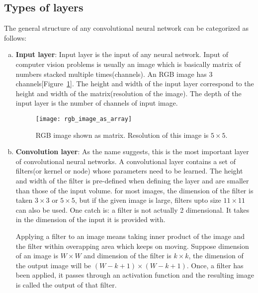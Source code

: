 \subsection{Types of layers}
\label{subsection:types_of_layers}
The general structure of any convolutional neural network can be categorized as follows:
\begin{enumerate}[(a)]
    \item \textbf{Input layer}:
        Input layer is the input of any neural network. Input of computer vision problems is usually an image which is basically matrix of numbers stacked multiple times(channels). An RGB image has 3 channels[Figure~\ref{fig:RGB_image}]. The height and width of the input layer correspond to the height and width of the matrix(resolution of the image). The depth of the input layer is the number of channels of input image.
        \begin{figure}[h!]
            \centering
            \texttt{[image: rgb\_image\_as\_array]}
            \caption[RGB image shown as matrix]{RGB image shown as matrix. Resolution of this image is $5\times5$.}
            \label{fig:RGB_image}
        \end{figure}
        
    \item \textbf{Convolution layer}:
        As the name suggests, this is the most important layer of convolutional neural networks. A convolutional layer contains a set of filters(or kernel or node) whose parameters need to be learned. The height and width of the filter is pre-defined when defining the layer and are smaller than those of the input volume. for most images, the dimension of the filter is taken $3\times3$ or $5\times5$, but if the given image is large, filters upto size $11\times11$ can also be used. One catch is: a filter is not actually 2 dimensional. It takes in the dimension of the input it is provided with.

        Applying a filter to an image means taking inner product of the image and the filter within overapping area which keeps on moving. Suppose dimension of an image is $W\times W$ and dimension of the filter is $k\times k$, the dimension of the output image will be $(W-k+1)\times (W-k+1)$. Once, a filter has been applied, it passes through an activation function and the resulting image is called the output of that filter.
    

\end{enumerate}
